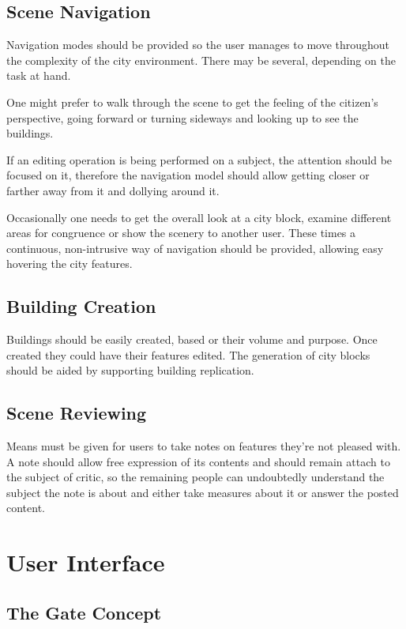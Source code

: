 \subsection{Scene Navigation}

Navigation modes should be provided so the user manages
to move throughout the complexity of the city environment.
There may be several, depending on the task at hand.

One might prefer to walk through the scene to get the feeling of the citizen's perspective,
going forward or turning sideways and looking up to see the buildings.

If an editing operation is being performed on a subject, the attention should be focused on it,
therefore the navigation model should allow getting closer or farther away from it and dollying around it.

Occasionally one needs to get the overall look at a city block, examine different areas for congruence
or show the scenery to another user. These times a continuous, non-intrusive way of navigation should be provided,
allowing easy hovering the city features.


\subsection{Building Creation}

Buildings should be easily created, based or their volume and purpose.
Once created they could have their features edited.
The generation of city blocks should be aided by supporting building replication.


\subsection{Scene Reviewing}

Means must be given for users to take notes on features they're not pleased with.
A note should allow free expression of its contents and should remain attach to the
subject of critic, so the remaining people can undoubtedly understand the subject
the note is about and either take measures about it or answer the posted content.




\section{User Interface}


\subsection{The Gate Concept}
\label{sec:gate-concept}

